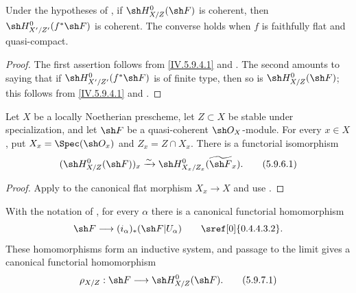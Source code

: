 \begin{corollary}[5.9.5]
\label{IV.5.9.5}
Under the hypotheses of , if
$\sh H^0_{X/Z}(\sh F)$ is coherent, then
$\sh H^0_{X'/Z'}(f^*\sh F)$ is coherent.  The converse holds when
$f$ is faithfully flat and quasi-compact.
\end{corollary}

\begin{proof}
The first assertion follows from \eqref{IV.5.9.4.1} and
.  The second amounts to saying that if
$\sh H^0_{X'/Z'}(f^*\sh F)$ is of finite type, then so is
$\sh H^0_{X/Z}(\sh F)$; this follows from \eqref{IV.5.9.4.1} and
.
\end{proof}

\begin{corollary}[5.9.6]
\label{IV.5.9.6}
Let $X$ be a locally Noetherian prescheme, let $Z\subset X$ be stable
under specialization, and let $\sh F$ be a quasi-coherent
$\sh O_X$-module.  For every $x\in X$, put
$X_x=\Spec(\sh O_x)$ and $Z_x=Z\cap X_x$.  There is a functorial
isomorphism
\begin{equation}
\label{IV.5.9.6.1}
 (\sh H^0_{X/Z}(\sh F))_x
 \xrightarrow{\sim}
 \sh H^0_{X_x/Z_x}(\widetilde{\sh F}_x).
\tag{5.9.6.1}
\end{equation}
\end{corollary}

\begin{proof}
Apply  to the canonical flat morphism $X_x\to X$ and
use .
\end{proof}

\begin{env}[5.9.7]
\label{IV.5.9.7}
With the notation of , for every $\alpha$ there is a
canonical functorial homomorphism
\[
 \sh F\longrightarrow(i_\alpha)_*(\sh F|U_\alpha)
 \qquad\text{\sref[0]{0.4.4.3.2}}.
\]
These homomorphisms form an inductive system, and passage to the
limit gives a canonical functorial homomorphism
\begin{equation}
\label{IV.5.9.7.1}
 \rho_{X/Z}:\sh F\longrightarrow\sh H^0_{X/Z}(\sh F).
\tag{5.9.7.1}
\end{equation}
\end{env}

